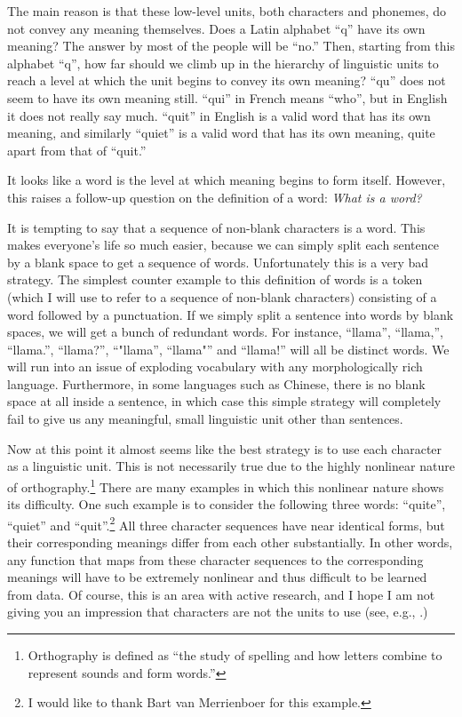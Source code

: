 \documentclass{report}
\begin{document}
The main reason is that these low-level units, both characters and phonemes, do
not convey any meaning themselves. Does a Latin alphabet ``q'' have its own
meaning? The answer by most of the people will be ``no.'' Then, starting from
this alphabet ``q'', how far should we climb up in the hierarchy of linguistic
units to reach a level at which the unit begins to convey its own meaning?
``qu'' does not seem to have its own meaning still. ``qui'' in French means
``who'', but in English it does not really say much. ``quit'' in English is a
valid word that has its own meaning, and similarly ``quiet'' is a valid word
that has its own meaning, quite apart from that of ``quit.''

It looks like a word is the level at which meaning begins to form itself.
However, this raises a follow-up question on the definition of a word: {\em What
is a word?}

It is tempting to say that a sequence of non-blank characters is a word. This
makes everyone's life so much easier, because we can simply split each sentence
by a blank space to get a sequence of words. Unfortunately this is a very bad
strategy. The simplest counter example to this definition of words is a token
(which I will use to refer to a sequence of non-blank characters) consisting of
a word followed by a punctuation. If we simply split a sentence into words by
blank spaces, we will get a bunch of redundant words. For instance, ``llama'',
``llama,'', ``llama.'', ``llama?'', ``"llama'', ``llama"'' and ``llama!'' will
all be distinct words. We will run into an issue of exploding vocabulary with
any morphologically rich language. Furthermore, in some languages such as
Chinese, there is no blank space at all inside a sentence, in which case this
simple strategy will completely fail to give us any meaningful, small linguistic
unit other than sentences.

Now at this point it almost seems like the best strategy is to use each
character as a linguistic unit. This is not necessarily true due to the highly
nonlinear nature of orthography.\footnote{
    Orthography is defined as ``the study of spelling and how letters combine to
    represent sounds and form words.''
} There are many examples in which this nonlinear nature shows its difficulty.
One such example is to consider the following three words: ``quite'', ``quiet''
and ``quit''.\footnote{
    I would like to thank Bart van Merrienboer for this example.
}
All three character sequences have near identical forms, but their corresponding
meanings differ from each other substantially. In other words, any function that
maps from these character sequences to the corresponding meanings will have to
be extremely nonlinear and thus difficult to be learned from data. Of course,
this is an area with active research, and I hope I am not giving you an
impression that characters are not the units to use (see, e.g.,
\cite{kim2015character}.)
\end{document}
